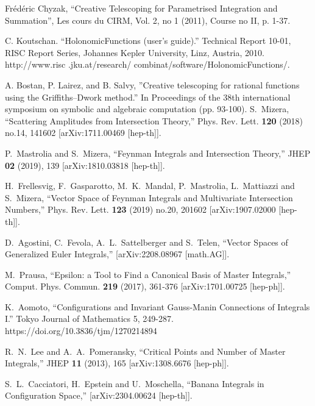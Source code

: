 \documentclass[a4paper,12pt]{article}
\numberwithin{equation}{section}
\numberwithin{figure}{section}
\begin{document}
\begin{thebibliography}{99}
 Fr\'ed\'eric Chyzak, ``Creative Telescoping for
  Parametrised Integration and Summation'',  Les cours du CIRM,  Vol. 2, no 1 (2011), Course no II, p. 1-37.


 C. Koutschan. ``HolonomicFunctions (user's guide).'' Technical Report 10-01, RISC Report Series, Johannes Kepler University, Linz, Austria, 2010. http://www.risc
.jku.at/research/ combinat/software/HolonomicFunctions/.

 A. Bostan, P. Lairez, and B. Salvy,
  ''Creative telescoping for rational functions using the
  Griffiths--Dwork method.'' In Proceedings of the 38th international
  symposium on symbolic and algebraic computation (pp. 93-100). 
S.~Mizera,
``Scattering Amplitudes from Intersection Theory,''
Phys. Rev. Lett. \textbf{120} (2018) no.14, 141602
[arXiv:1711.00469 [hep-th]].

P.~Mastrolia and S.~Mizera,
``Feynman Integrals and Intersection Theory,''
JHEP \textbf{02} (2019), 139
[arXiv:1810.03818 [hep-th]].

H.~Frellesvig, F.~Gasparotto, M.~K.~Mandal, P.~Mastrolia, L.~Mattiazzi and S.~Mizera,
``Vector Space of Feynman Integrals and Multivariate Intersection Numbers,''
Phys. Rev. Lett. \textbf{123} (2019) no.20, 201602
[arXiv:1907.02000 [hep-th]].

D.~Agostini, C.~Fevola, A.~L.~Sattelberger and S.~Telen,
``Vector Spaces of Generalized Euler Integrals,''
[arXiv:2208.08967 [math.AG]].

  
M.~Prausa,
``Epsilon: a Tool to Find a Canonical Basis of Master Integrals,''
Comput. Phys. Commun. \textbf{219} (2017), 361-376
[arXiv:1701.00725 [hep-ph]].

  K.~Aomoto, ``Configurations and Invariant Gauss-Manin Connections of Integrals I.'' Tokyo Journal of Mathematics 5, 249-287. https://doi.org/10.3836/tjm/1270214894



R.~N.~Lee and A.~A.~Pomeransky,
``Critical Points and Number of Master Integrals,''
JHEP \textbf{11} (2013), 165
[arXiv:1308.6676 [hep-ph]].
  
S.~L.~Cacciatori, H.~Epstein and U.~Moschella,
``Banana Integrals in Configuration Space,''
[arXiv:2304.00624 [hep-th]].
  

\end{thebibliography}
\end{document}
